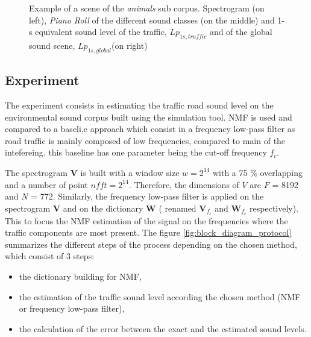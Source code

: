\documentclass[twocolumn,a4paper,10pt]{article}
\begin{document}
\begin{figure}
\begin{minipage}[c]{.32\linewidth}
   \end{minipage}
\caption{Example of a scene of the \textit{animals} sub corpus. Spectrogram (on left), \textit{Piano Roll} of the different sound classes (on the middle) and 1-s equivalent sound level of the traffic, $Lp_{1s,traffic}$ and of the global sound scene, $Lp_{1s,global}$(on right)}
\label{fig:exampleScene}
\end{figure}

\subsection{Experiment}

The experiment consists in estimating the traffic road sound level on the environmental sound corpus built using the simulation tool. NMF is used and compared to a baseli,e approach which consist in a frequency low-pass filter as road traffic is mainly composed of low frequencies, compared to main of the intefereing. this baseline has one parameter being the cut-off frequency $f_c$.

The spectrogram $\mathbf{V}$ is built with a window size $w = 2^{14}$ with a 75 $\%$ overlapping and a number of point $nfft = 2^{14}$. Therefore, the dimensions of $V$ are $F$ = 8192 and $N$ = 772.  Similarly, the frequency low-pass filter is applied on the spectrogram $\mathbf{V}$ and on the dictionary $\mathbf{W}$ ( renamed $\mathbf{V}_{f_c}$ and $\mathbf{W}_{f_c}$ respectively). This to focus the NMF estimation of the signal on the frequencies where the traffic components are most present. The figure \ref{fig:block_diagram_protocol} summarizes the different steps of the process depending on the chosen method, which consist of 3 steps:

\begin{itemize}
\item the dictionary building for NMF,
\item the estimation of the traffic sound level according the chosen method (NMF or frequency low-pass filter),
\item the calculation of the error between the exact and the estimated sound levels.\\
\end{itemize}
\end{document}
